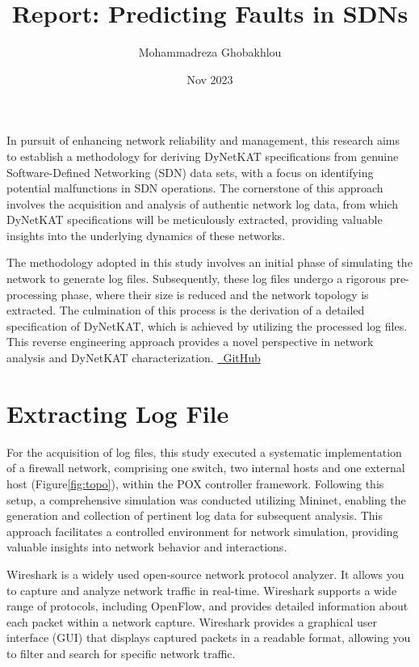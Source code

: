 \documentclass[english,10pt]{article}
\title{Report: Predicting Faults in SDNs}
\author{Mohammadreza Ghobakhlou}
\date{Nov 2023}
\begin{document}
\maketitle
{\selectfont}


In pursuit of enhancing network reliability and management, this research aims to establish a methodology for deriving DyNetKAT specifications from genuine Software-Defined Networking (SDN) data sets, with a focus on identifying potential malfunctions in SDN operations. The cornerstone of this approach involves the acquisition and analysis of authentic network log data, from which DyNetKAT specifications will be meticulously extracted, providing valuable insights into the underlying dynamics of these networks.

The methodology adopted in this study involves an initial phase of simulating the network to generate log files. Subsequently, these log files undergo a rigorous pre-processing phase, where their size is reduced and the network topology is extracted. The culmination of this process is the derivation of a detailed specification of DyNetKAT, which is achieved by utilizing the processed log files. This reverse engineering approach provides a novel perspective in network analysis and DyNetKAT characterization. \href{https://github.com/mghobakhlou/DyNetKAT_Spec_from_SDNLog}{\faGithubSquare \ GitHub} 


\section{Extracting Log File}

For the acquisition of log files, this study executed a systematic implementation of a firewall network, comprising one switch, two internal hosts and one external host (Figure\ref{fig:topo}), within the POX controller framework. Following this setup, a comprehensive simulation was conducted utilizing Mininet, enabling the generation and collection of pertinent log data for subsequent analysis. This approach facilitates a controlled environment for network simulation, providing valuable insights into network behavior and interactions. 


Wireshark is a widely used open-source network protocol analyzer. It allows you to capture and analyze network traffic in real-time. Wireshark supports a wide range of protocols, including OpenFlow, and provides detailed information about each packet within a network capture. Wireshark provides a graphical user interface (GUI) that displays captured packets in a readable format, allowing you to filter and search for specific network traffic.
\end{document}
